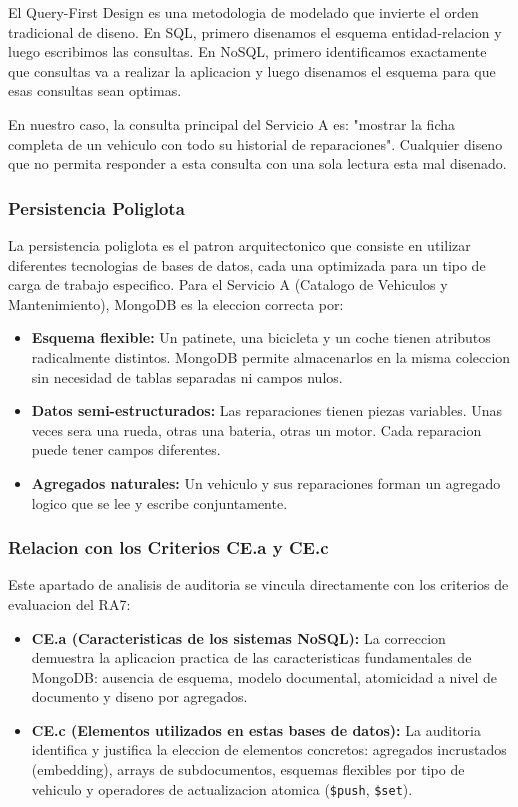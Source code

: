El Query-First Design es una metodologia de modelado que invierte el orden tradicional de diseno. En SQL, primero disenamos el esquema entidad-relacion y luego escribimos las consultas. En NoSQL, primero identificamos exactamente que consultas va a realizar la aplicacion y luego disenamos el esquema para que esas consultas sean optimas.

En nuestro caso, la consulta principal del Servicio A es: "mostrar la ficha completa de un vehiculo con todo su historial de reparaciones". Cualquier diseno que no permita responder a esta consulta con una sola lectura esta mal disenado.

\subsubsection{Persistencia Poliglota}

La persistencia poliglota es el patron arquitectonico que consiste en utilizar diferentes tecnologias de bases de datos, cada una optimizada para un tipo de carga de trabajo especifico. Para el Servicio A (Catalogo de Vehiculos y Mantenimiento), MongoDB es la eleccion correcta por:

\begin{itemize}
    \item \textbf{Esquema flexible:} Un patinete, una bicicleta y un coche tienen atributos radicalmente distintos. MongoDB permite almacenarlos en la misma coleccion sin necesidad de tablas separadas ni campos nulos.
    \item \textbf{Datos semi-estructurados:} Las reparaciones tienen piezas variables. Unas veces sera una rueda, otras una bateria, otras un motor. Cada reparacion puede tener campos diferentes.
    \item \textbf{Agregados naturales:} Un vehiculo y sus reparaciones forman un agregado logico que se lee y escribe conjuntamente.
\end{itemize}

\subsubsection{Relacion con los Criterios CE.a y CE.c}

Este apartado de analisis de auditoria se vincula directamente con los criterios de evaluacion del RA7:

\begin{itemize}
    \item \textbf{CE.a (Caracteristicas de los sistemas NoSQL):} La correccion demuestra la aplicacion practica de las caracteristicas fundamentales de MongoDB: ausencia de esquema, modelo documental, atomicidad a nivel de documento y diseno por agregados.
    \item \textbf{CE.c (Elementos utilizados en estas bases de datos):} La auditoria identifica y justifica la eleccion de elementos concretos: agregados incrustados (embedding), arrays de subdocumentos, esquemas flexibles por tipo de vehiculo y operadores de actualizacion atomica (\texttt{\$push}, \texttt{\$set}).
\end{itemize}

